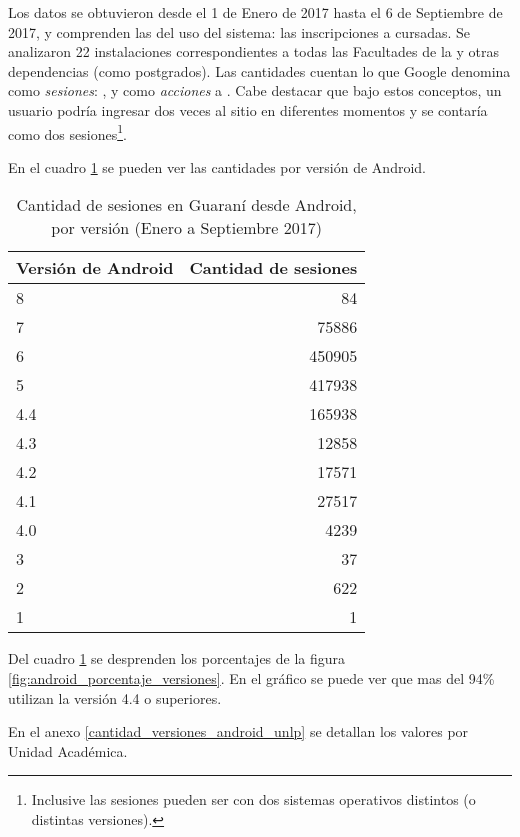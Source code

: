 Los datos se obtuvieron desde el 1 de Enero de 2017 hasta el 6 de Septiembre de 2017, y comprenden las  del uso del sistema: las inscripciones a cursadas. Se analizaron 22 instalaciones correspondientes a todas las Facultades de la \unlp{} y otras dependencias (como postgrados).
Las cantidades cuentan lo que Google denomina como \textit{sesiones}: , y como \textit{acciones} a \cite{google2017analyticsSesion}.
Cabe destacar que bajo estos conceptos, un usuario podría ingresar dos veces al sitio en diferentes momentos y se contaría como dos sesiones\footnote{Inclusive las sesiones pueden ser con dos sistemas operativos distintos (o distintas versiones).}. 

En el cuadro \ref{android_versiones_cantidad} se pueden ver las cantidades por versión de Android.

\begin{table}[htbp]
\centering
\caption{Cantidad de sesiones en Guaraní desde Android, por versión (Enero a Septiembre 2017)}
\label{android_versiones_cantidad}
\begin{tabular}{|l|r|}
\hline
\textbf{Versión de Android} & \multicolumn{1}{l|}{\textbf{Cantidad de sesiones}} \\ \hline
8   & 84     \\ \hline
7   & 75886  \\ \hline
6   & 450905 \\ \hline
5   & 417938 \\ \hline
4.4 & 165938 \\ \hline
4.3 & 12858  \\ \hline
4.2 & 17571  \\ \hline
4.1 & 27517  \\ \hline
4.0 & 4239   \\ \hline
3   & 37     \\ \hline
2   & 622    \\ \hline
1   & 1     \\ \hline
\end{tabular}
\end{table}

Del cuadro \ref{android_versiones_cantidad} se desprenden los porcentajes de la figura \ref{fig:android_porcentaje_versiones}. En el gráfico se puede ver que mas del 94\% utilizan la versión 4.4 o superiores.


En el anexo \ref{cantidad_versiones_android_unlp} se detallan los valores por Unidad Académica.